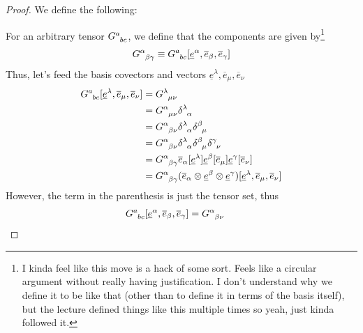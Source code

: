 \documentclass[12pt,a4paper]{article}
\newcommand{\und}[1]{\underline{#1}}
\newcommand{\ovr}[1]{\overline{#1}}
\begin{document}
\begin{solution_pset}
\begin{enumerate}[(1)]
				\begin{proof}

					We define the following: 

					For an arbitrary tensor $G\indices{^a_{bc}}$,
					we define that the components are given by\footnote{
						I kinda feel like this move is a hack of some sort.
						Feels like a circular argument without really having justification.
						I don't understand why we define it to be like that (other 
						than to define it in terms of the basis itself), but the lecture defined things like
						this multiple times so yeah, just kinda followed it.
					}
					\[
						G\indices{^\alpha_{\beta\gamma}}
						\equiv
						G\indices{^a_{bc}} 
						[
							\und e^\alpha,
							\ovr e_\beta,
							\ovr e_\gamma
						]
					\]
					Thus, let's feed the basis covectors and vectors $
							\und e^\lambda,
							\ovr e_\mu,
							\ovr e_\nu
					$
					\begin{align*}
						G\indices{^a_{bc}} 
						[
							\und e^\lambda,
							\ovr e_\mu,
							\ovr e_\nu
						]
						&=
						G\indices{^\lambda_{\mu\nu}}
						\\
						&=
						G\indices{^\alpha_{\mu\nu}}
						\delta\indices{^\lambda_\alpha}
						\\
						&=
						G\indices{^\alpha_{\beta\nu}}
						\delta\indices{^\lambda_\alpha}
						\delta\indices{^\beta_\mu}
						\\
						&=
						G\indices{^\alpha_{\beta\nu}}
						\delta\indices{^\lambda_\alpha}
						\delta\indices{^\beta_\mu}
						\delta\indices{^\gamma_\nu}
						\\
						&=
						G\indices{^\alpha_{\beta\gamma}}
						\ovr e_{\alpha}
						[\und e^\lambda]
						\und e^{\beta}
						[\ovr e_\mu]
						\und e^{\gamma}
						[\ovr e_\nu]
						\\
						&=
						G\indices{^\alpha_{\beta\gamma}}
						(
							\ovr e_\alpha \otimes \und e^\beta \otimes \und e^\gamma
						)
						[
							\und e^\lambda,
							\ovr e_\mu,
							\ovr e_\nu
						]
					\end{align*}
					However, the term in the parenthesis is just
					the tensor set,
					thus
					\begin{align*}
						G\indices{^a_{bc}} 
						[
							\und e^\alpha,
							\ovr e_\beta,
							\ovr e_\gamma
						]
						&=
						G\indices{^\alpha_{\beta\nu}}\ 

\end{align*}
\end{proof}
\end{enumerate}
\end{solution_pset}
\end{document}
